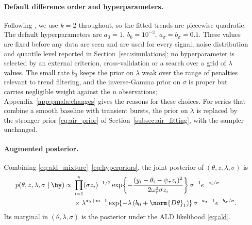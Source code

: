 \paragraph{Default difference order and hyperparameters.} Following \citet{brantley2020baseline}, we use $k = 2$ throughout, so the fitted trends are piecewise quadratic. The default hyperparameters are $a_0 = 1$, $b_0 = 10^{-3}$, $a_\sigma = b_\sigma = 0.1$. These values are fixed before any data are seen and are used for every signal, noise distribution and quantile level reported in Section~\ref{sec:simulations}; no hyperparameter is selected by an external criterion, cross-validation or a search over a grid of $\lambda$ values. The small rate $b_0$ keeps the prior on $\lambda$ weak over the range of penalties relevant to trend filtering, and the inverse-Gamma prior on $\sigma$ is proper but carries negligible weight against the $n$ observations; Appendix~\ref{app:pmala:changes} gives the reasons for these choices. For series that combine a smooth baseline with transient bursts, the prior on $\lambda$ is replaced by the stronger prior \eqref{eq:air_prior} of Section~\ref{subsec:air_fitting}, with the sampler unchanged.

\paragraph{Augmented posterior.} Combining \eqref{eq:ald_mixture}--\eqref{eq:hyperpriors}, the joint posterior of $(\theta, z, \lambda, \sigma)$ is
\begin{equation}
\begin{aligned}
    p(\theta, z, \lambda, \sigma \mid \by) \propto{} & \prod_{i=1}^n (\sigma z_i)^{-1/2} \exp\!\left\{-\frac{(y_i-\theta_i-\psi_\tau z_i)^2}{2\omega_\tau^2 \sigma z_i}\right\} \sigma^{-1} e^{-z_i/\sigma} \\
    & \times \lambda^{a_0 + m - 1} \exp\!\left\{-\lambda\left(b_0 + \norm{D\theta}_1\right)\right\} \sigma^{-a_\sigma - 1} e^{-b_\sigma/\sigma}.
\end{aligned}
    \label{eq:posterior}
\end{equation}
Its marginal in $(\theta, \lambda, \sigma)$ is the posterior under the ALD likelihood \eqref{eq:ald}.


